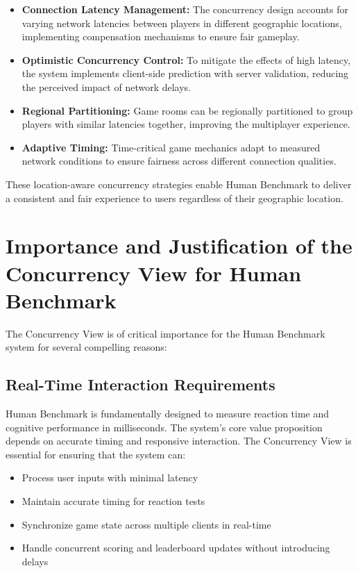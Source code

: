 \begin{itemize}
    \item \textbf{Connection Latency Management:} The concurrency design accounts for varying network latencies between players in different geographic locations, implementing compensation mechanisms to ensure fair gameplay.
    
    \item \textbf{Optimistic Concurrency Control:} To mitigate the effects of high latency, the system implements client-side prediction with server validation, reducing the perceived impact of network delays.
    
    \item \textbf{Regional Partitioning:} Game rooms can be regionally partitioned to group players with similar latencies together, improving the multiplayer experience.
    
    \item \textbf{Adaptive Timing:} Time-critical game mechanics adapt to measured network conditions to ensure fairness across different connection qualities.
\end{itemize}

These location-aware concurrency strategies enable Human Benchmark to deliver a consistent and fair experience to users regardless of their geographic location.

\section{Importance and Justification of the Concurrency View for Human Benchmark}

The Concurrency View is of critical importance for the Human Benchmark system for several compelling reasons:

\subsection{Real-Time Interaction Requirements}

Human Benchmark is fundamentally designed to measure reaction time and cognitive performance in milliseconds. The system's core value proposition depends on accurate timing and responsive interaction. The Concurrency View is essential for ensuring that the system can:

\begin{itemize}
    \item Process user inputs with minimal latency
    \item Maintain accurate timing for reaction tests
    \item Synchronize game state across multiple clients in real-time
    \item Handle concurrent scoring and leaderboard updates without introducing delays
\end{itemize}

